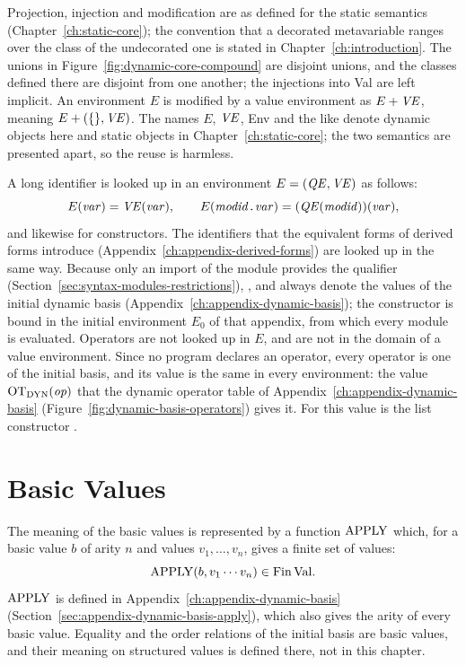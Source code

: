 Projection, injection and modification are as defined for the static
semantics (Chapter~\ref{ch:static-core}); the convention that a decorated
metavariable ranges over the class of the undecorated one is stated in
Chapter~\ref{ch:introduction}. %
The
unions in Figure~\ref{fig:dynamic-core-compound} are disjoint unions, and the
classes defined there are disjoint from one another; the injections into Val
are left implicit. An environment $E$ is modified by a
value environment as $E+\mathit{VE}$, meaning $E+(\{\},\mathit{VE})$.
The names $E$, $\mathit{VE}$, Env and the like denote dynamic objects here and
static objects in Chapter~\ref{ch:static-core}; the two semantics are
presented apart, so the reuse is harmless.

A long identifier is looked up in an environment $E=(\mathit{QE},\mathit{VE})$ as follows:
\[
  E(\mathit{var})=\mathit{VE}(\mathit{var}),\qquad
  E(\mathit{modid}\textnormal{\texttt{.}}\mathit{var})=(\mathit{QE}(\mathit{modid}))(\mathit{var}),
\]
and likewise for constructors. The identifiers that the equivalent forms of
derived forms introduce (Appendix~\ref{ch:appendix-derived-forms}) are looked
up in the same way. Because only an import of the module  provides
the qualifier  (Section~\ref{sec:syntax-modules-restrictions}),
,  and  always denote the
values of the initial dynamic basis
(Appendix~\ref{ch:appendix-dynamic-basis}); the constructor \kw{::} is bound
in the initial environment $E_0$ of that appendix, from which every module is
evaluated. %
Operators are not looked up in $E$, and are
not in the domain of a value environment. Since no program declares an
operator, every operator is one of the initial basis, and its value is the
same in every environment: the value $\mathrm{OT}_{\mathrm{DYN}}(\mathit{op})$ that the dynamic
operator table of Appendix~\ref{ch:appendix-dynamic-basis}
(Figure~\ref{fig:dynamic-basis-operators}) gives it. For \kw{::} this value
is the list constructor \kw{::}. %

\section{Basic Values}\label{sec:dynamic-core-basic}

The meaning of the basic values is represented by a function $\mathrm{APPLY}$ which,
for a basic value $b$ of arity $n$ and values $v_1,\ldots,v_n$, gives a finite
set of values:
\[
  \mathrm{APPLY}(b, v_1\cdots v_n)\in\mathrm{Fin}\,\mathrm{Val} .
\]
$\mathrm{APPLY}$ is defined in Appendix~\ref{ch:appendix-dynamic-basis}
(Section~\ref{sec:appendix-dynamic-basis-apply}), which also gives the arity
of every basic value. Equality and the order relations of the initial basis
are basic values, and their meaning on structured values is defined there,
not in this chapter. %

